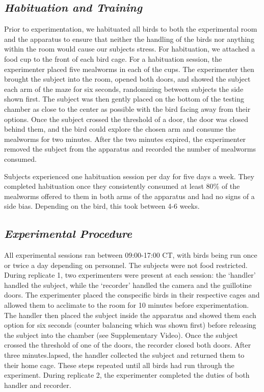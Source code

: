 \documentclass[
  ,pub,floatsintext]{apa6}
\begin{document}
\hypertarget{habituation-and-training-1}{%
\subsection{\texorpdfstring{\emph{Habituation and Training}}{Habituation and Training}}\label{habituation-and-training-1}}

Prior to experimentation, we habituated all birds to both the experimental room and the apparatus to ensure that neither the handling of the birds nor anything within the room would cause our subjects stress. For habituation, we attached a food cup to the front of each bird cage. For a habituation session, the experimenter placed five mealworms in each of the cups. The experimenter then brought the subject into the room, opened both doors, and showed the subject each arm of the maze for six seconds, randomizing between subjects the side shown first. The subject was then gently placed on the bottom of the testing chamber as close to the center as possible with the bird facing away from their options. Once the subject crossed the threshold of a door, the door was closed behind them, and the bird could explore the chosen arm and consume the mealworms for two minutes. After the two minutes expired, the experimenter removed the subject from the apparatus and recorded the number of mealworms consumed.

Subjects experienced one habituation session per day for five days a week. They completed habituation once they consistently consumed at least 80\% of the mealworms offered to them in both arms of the apparatus and had no signs of a side bias. Depending on the bird, this took between 4-6 weeks.

\hypertarget{experimental-procedure-1}{%
\subsection{\texorpdfstring{\emph{Experimental Procedure}}{Experimental Procedure}}\label{experimental-procedure-1}}

All experimental sessions ran between 09:00-17:00 CT, with birds being run once or twice a day depending on personnel. The subjects were not food restricted. During replicate 1, two experimenters were present at each session: the `handler' handled the subject, while the `recorder' handled the camera and the guillotine doors. The experimenter placed the conspecific birds in their respective cages and allowed them to acclimate to the room for 10 minutes before experimentation. The handler then placed the subject inside the apparatus and showed them each option for six seconds (counter balancing which was shown first) before releasing the subject into the chamber (see Supplementary Video). Once the subject crossed the threshold of one of the doors, the recorder closed both doors. After three minutes.lapsed, the handler collected the subject and returned them to their home cage. These steps repeated until all birds had run through the experiment. During replicate 2, the experimenter completed the duties of both handler and recorder.
\end{document}
